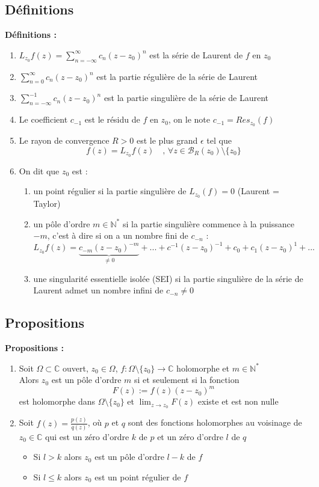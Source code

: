 \subsection{Définitions}
\textbf{Définitions :}
\begin{enumerate}
    \item $L_{z_0}f(z) = \sum_{n=-\infty}^{\infty}c_n(z-z_0)^n$ est la série de Laurent de $f$ en $z_0$
    \item $\sum_{n=0}^{\infty}c_n(z-z_0)^n$ est la partie régulière de la série de Laurent
    \item $\sum_{n=-\infty}^{-1}c_n(z-z_0)^n$ est la partie singulière de la série de Laurent
    \item Le coefficient $c_{-1}$ est le résidu de $f$ en $z_0$, on le note $c_{-1} = Res_{z_0}(f)$
    \item Le rayon de convergence $R>0$ est le plus grand $\epsilon$ tel que
    $$f(z) = L_{z_0}f(z) \quad \text{, } \forall z \in \mathcal{B}_R(z_0) \setminus \{z_0\}$$
    \item On dit que $z_0$ est :
    \begin{enumerate}
        \item un point régulier si la partie singulière de $L_{z_0}(f) = 0$ (Laurent = Taylor)
        \item un pôle d'ordre $m \in \mathbb{N}^*$ si la partie singulière commence à la puissance $-m$, c'est à dire si on a un nombre fini de $c_{-n}$ :
        $$L_{z_0}f(z) = \underbrace{c_{-m}(z-z_0)^{-m}}_{\neq0}+...+c^{-1}(z-z_0)^{-1}+c_0+c_1(z-z_0)^1+...$$
        \item une singularité essentielle isolée (SEI) si la partie singulière de la série de Laurent admet un nombre infini de $c_{-n} \neq 0$
    \end{enumerate}
\end{enumerate}

\subsection{Propositions}
\textbf{Propositions :}
\begin{enumerate}
    \item Soit $\Omega \subset \mathbb{C}$ ouvert, $z_0 \in \Omega$, $f : \Omega \setminus \{z_0\} \to \mathbb{C}$ holomorphe et $m \in \mathbb{N}^*$\\
        Alors $z_0$ est un pôle d'ordre $m$ si et seulement si la fonction
    $$F(z) := f(z)(z-z_0)^m$$
    est holomorphe dans $\Omega \setminus \{z_0\}$ et $\lim_{z \to z_0}F(z)$ existe et est non nulle
    \item Soit $f(z) = \frac{p(z)}{q(z)}$, où $p$ et $q$ sont des fonctions holomorphes au voisinage de $z_0 \in \mathbb{C}$ qui est un zéro d’ordre $k$ de $p$ et un zéro d’ordre $l$ de $q$
    \begin{itemize}
        \item Si $l > k$ alors $z_0$ est un pôle d'ordre $l-k$ de $f$
        \item Si $l \leq k$ alors $z_0$ est un point régulier de $f$
    \end{itemize}
\end{enumerate}